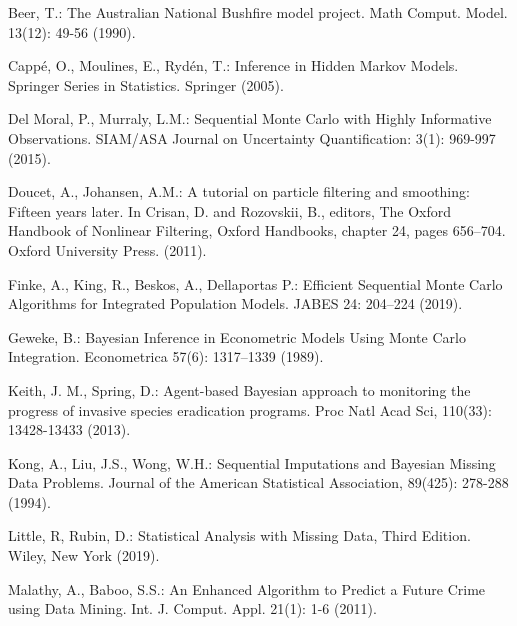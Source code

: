 \begin{thebibliography}{}

Beer, T.: The Australian National Bushfire model project. Math Comput. Model. 13(12): 49-56 (1990).

Capp\'{e}, O., Moulines, E., Ryd\'{e}n, T.: Inference in Hidden Markov Models. Springer Series in Statistics. Springer (2005).

Del Moral, P., Murraly, L.M.: Sequential Monte Carlo with Highly Informative Observations. SIAM/ASA Journal on Uncertainty Quantification: 3(1): 969-997 (2015).

Doucet, A., Johansen, A.M.: A tutorial on particle filtering and smoothing: Fifteen years later. In Crisan, D. and Rozovskii, B., editors, The Oxford Handbook of Nonlinear Filtering, Oxford Handbooks, chapter 24, pages 656–704. Oxford University Press. (2011).

Finke, A., King, R., Beskos, A., Dellaportas P.: Efficient Sequential Monte Carlo Algorithms for Integrated Population Models. JABES 24: 204–224 (2019).

Geweke, B.: Bayesian Inference in Econometric Models Using Monte Carlo Integration. Econometrica 57(6): 1317–1339 (1989).

 Keith, J. M., Spring, D.: Agent-based Bayesian approach to monitoring the progress of invasive species eradication programs. Proc Natl Acad Sci, 110(33): 13428-13433 (2013).

 Kong, A., Liu, J.S., Wong, W.H.: Sequential Imputations and Bayesian Missing Data Problems. Journal of the American Statistical Association, 89(425): 278-288 (1994).

 Little, R, Rubin, D.: Statistical Analysis with Missing Data, Third Edition. Wiley, New York (2019).

Malathy, A., Baboo, S.S.: An Enhanced Algorithm to Predict a Future Crime using Data Mining. Int. J. Comput. Appl. 21(1): 1-6 (2011).


\end{thebibliography}
